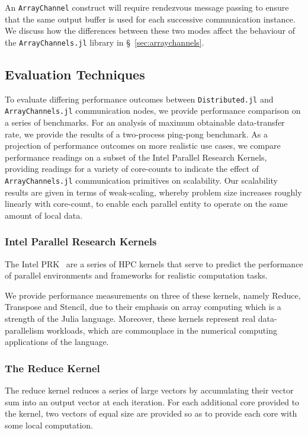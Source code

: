 An \texttt{ArrayChannel} construct will require rendezvous message
passing to ensure that the same output buffer is used for each
successive communication instance. We discuss how the differences
between these two modes affect the behaviour of the
\texttt{ArrayChannels.jl} library in \S~\ref{sec:arraychannels}.

\subsection{Evaluation Techniques}
\label{sec:eval}

To evaluate differing performance outcomes between
\texttt{Distributed.jl} and \texttt{ArrayChannels.jl} communication
nodes, we provide performance comparison on a series of benchmarks. For
an analysis of maximum obtainable data-transfer rate, we provide the
results of a two-process ping-pong benchmark. As a projection of
performance outcomes on more realistic use cases, we compare performance
readings on a subset of the Intel Parallel Research Kernels, providing
readings for a variety of core-counts to indicate the effect of
\texttt{ArrayChannels.jl} communication primitives on scalability. Our
scalability results are given in terms of weak-scaling, whereby problem
size increases roughly linearly with core-count, to enable each parallel
entity to operate on the same amount of local data.

\subsubsection{Intel Parallel Research Kernels}
\label{sec:intel-prk}

The Intel PRK~\cite{Wijngaart} are a series of HPC
kernels that serve to predict the performance of parallel environments
and frameworks for realistic computation tasks.

We provide performance measurements on three of these kernels, namely
Reduce, Transpose and Stencil, due to their emphasis on array computing
which is a strength of the Julia language. Moreover, these kernels
represent real data-parallelism workloads, which are commonplace in the
numerical computing applications of the language.

\subsubsection{The Reduce Kernel}

The reduce kernel reduces a series of large vectors by accumulating
their vector sum into an output vector at each iteration. For each
additional core provided to the kernel, two vectors of equal size are
provided so as to provide each core with some local computation.

